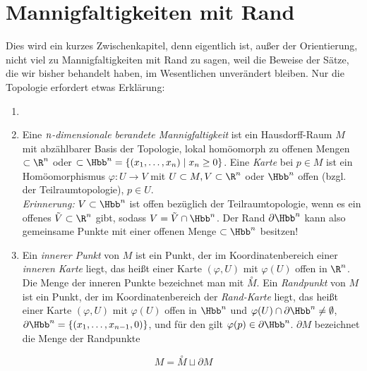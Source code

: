 \chapter{Mannigfaltigkeiten mit Rand}\lecture

Dies wird ein kurzes Zwischenkapitel, denn eigentlich ist, außer der Orientierung, nicht viel zu Mannigfaltigkeiten mit Rand zu sagen, weil die Beweise der Sätze, die wir bisher behandelt haben, im Wesentlichen unverändert bleiben. Nur die Topologie erfordert etwas Erklärung:

\begin{defn}\autolabel{}
	\begin{enumerate}[label={\roman*})]
		\item[]
		\item Eine \emph{$\emph{n}$-dimensionale berandete Mannigfaltigkeit} ist ein Hausdorff-Raum $M$ mit abzählbarer Basis der Topologie, lokal homöomorph zu offenen Mengen \( \subset \R^n \) oder \( \subset \Hbb^n = \{(x_1,\dotsc,x_n) \mid x_n \geq 0\} \). Eine \emph{Karte} bei $p \in M$ ist ein Homöomorphismus \( \varphi: U \to V \) mit $U \subset M, V \subset \R^n$ oder $\Hbb^n$ offen (bzgl. der Teilraumtopologie), $p \in U$.\\
			\emph{Erinnerung:} \( V \subset \Hbb^n \) ist offen bezüglich der Teilraumtopologie, wenn es ein offenes \( \tilde{V} \subset \R^n \) gibt, sodass \( V = \tilde{V} \cap \Hbb^n \). Der Rand $\partial \Hbb^n$ kann also gemeinsame Punkte mit einer offenen Menge $\subset \Hbb^n$ besitzen!
		\item Ein \emph{innerer Punkt} von $M$ ist ein Punkt, der im Koordinatenbereich einer \emph{inneren Karte} liegt, das heißt einer Karte $(\varphi,U)$ mit $\varphi(U)$ offen in $\R^n$. Die Menge der inneren Punkte bezeichnet man mit $\overset{\circ}{M}$. Ein \emph{Randpunkt} von $M$ ist ein Punkt, der im Koordinatenbereich der \emph{Rand-Karte} liegt, das heißt einer Karte $(\varphi,U)$ mit $\varphi(U)$ offen in $\Hbb^n$ und $\varphi(U) \cap \partial\Hbb^n \neq \emptyset$, \( \partial\Hbb^n = \{(x_1,\dotsc,x_{n-1},0)\} \), und für den gilt $\varphi(p) \in \partial \Hbb^n$. $\partial M$ bezeichnet die Menge der Randpunkte
	\end{enumerate}
\end{defn}

\begin{thm}\autolabel
	\[ M = \overset{\circ}{M} \sqcup \partial M \]
\end{thm}

